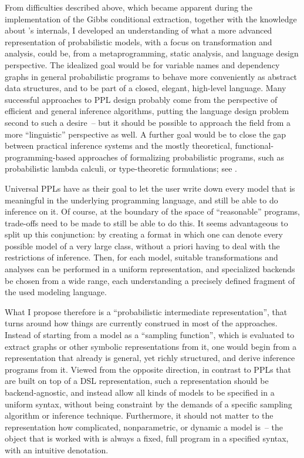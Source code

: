 From difficulties described above, which became apparent during the implementation of the Gibbs
conditional extraction, together with the knowledge about \dppljl{}'s internals, I developed an
understanding of what a more advanced representation of probabilistic models, with a focus on
transformation and analysis, could be, from a metaprogramming, static analysis, and language design
perspective.  The idealized goal would be for variable names and dependency graphs in general
probabilistic programs to behave more conveniently as abstract data structures, and to be part of a
closed, elegant, high-level language.  Many successful approaches to PPL design probably come from
the perspective of efficient and general inference algorithms, putting the language design problem
second to such a desire~-- but it should be possible to approach the field from a more
\enquote{linguistic} perspective as well.  A further goal would be to close the gap between
practical inference systems and the mostly theoretical, functional-programming-based approaches of
formalizing probabilistic programs, such as probabilistic lambda calculi, or type-theoretic
formulations; see
\textcite{ramsey2002stochastic,heunen2017convenient,bhat2012type,scibior2015practical}.

Universal PPLs have as their goal to let the user write down every model that is meaningful in the
underlying programming language, and still be able to do inference on it.  Of course, at the
boundary of the space of \enquote{reasonable} programs, trade-offs need to be made to still be able
to do this.  It seems advantageous to split up this conjunction: by creating a format in which one
can denote every possible model of a very large class, without a priori having to deal with the
restrictions of inference.  Then, for each model, suitable transformations and analyses can be
performed in a uniform representation, and specialized backends be chosen from a wide range, each
understanding a precisely defined fragment of the used modeling language.

What I propose therefore is a \enquote{probabilistic intermediate representation}, that turns around
how things are currently construed in most of the approaches.  Instead of starting from a model as a
\enquote{sampling function}, which is evaluated to extract graphs or other symbolic representations
from it, one would begin from a representation that already is general, yet richly structured, and
derive inference programs from it.  Viewed from the opposite direction, in contrast to PPLs that are
built on top of a DSL representation, such a representation should be backend-agnostic, and instead
allow all kinds of models to be specified in a uniform syntax, without being constraint by the
demands of a specific sampling algorithm or inference technique.  Furthermore, it should not matter
to the representation how complicated, nonparametric, or dynamic a model is~-- the object that is
worked with is always a fixed, full program in a specified syntax, with an intuitive denotation.

